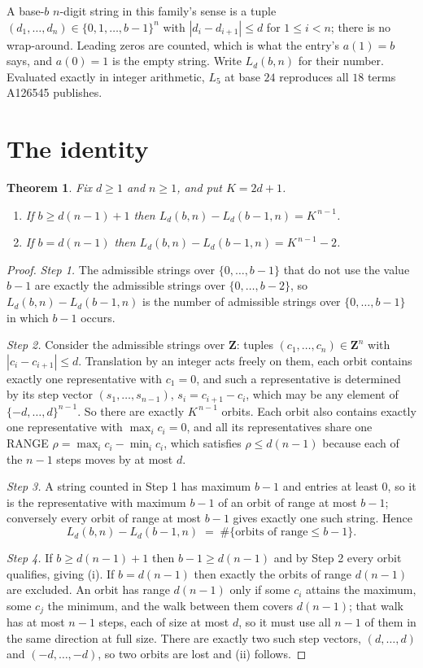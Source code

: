 \documentclass[11pt,a4paper]{article}
\theoremstyle{plain}
\newtheorem{theorem}{Theorem}
\theoremstyle{definition}
\begin{document}
A base-$b$ $n$-digit string in this family's sense is a tuple
$(d_1,\dots,d_n)\in\{0,1,\dots,b-1\}^{n}$ with $|d_i-d_{i+1}|\le d$ for $1\le i<n$; there
is no wrap-around. Leading zeros are counted, which is what the entry's $a(1)=b$ says, and
$a(0)=1$ is the empty string. Write $L_d(b,n)$ for their number. Evaluated exactly in integer
arithmetic, $L_{5}$ at base $24$ reproduces all $18$ terms A126545 publishes.

\section{The identity}

\begin{theorem}
Fix $d\ge1$ and $n\ge1$, and put $K=2d+1$.
\begin{enumerate}
\item[(i)] If $b\ge d(n-1)+1$ then $L_d(b,n)-L_d(b-1,n)=K^{\,n-1}$.
\item[(ii)] If $b=d(n-1)$ then $L_d(b,n)-L_d(b-1,n)=K^{\,n-1}-2$.
\end{enumerate}
\end{theorem}

\begin{proof}
\emph{Step 1.} The admissible strings over $\{0,\dots,b-1\}$ that do not use the value $b-1$
are exactly the admissible strings over $\{0,\dots,b-2\}$, so $L_d(b,n)-L_d(b-1,n)$ is the
number of admissible strings over $\{0,\dots,b-1\}$ in which $b-1$ occurs.

\emph{Step 2.} Consider the admissible strings over $\mathbf{Z}$: tuples
$(c_1,\dots,c_n)\in\mathbf{Z}^{n}$ with $|c_i-c_{i+1}|\le d$. Translation by an integer acts
freely on them, each orbit contains exactly one representative with $c_1=0$, and such a
representative is determined by its step vector $(s_1,\dots,s_{n-1})$, $s_i=c_{i+1}-c_i$,
which may be any element of $\{-d,\dots,d\}^{n-1}$. So there are exactly $K^{\,n-1}$ orbits.
Each orbit also contains exactly one representative with $\max_i c_i=0$, and all its
representatives share one RANGE $\rho=\max_ic_i-\min_ic_i$, which satisfies
$\rho\le d(n-1)$ because each of the $n-1$ steps moves by at most $d$.

\emph{Step 3.} A string counted in Step 1 has maximum $b-1$ and entries at least $0$, so it is
the representative with maximum $b-1$ of an orbit of range at most $b-1$; conversely every orbit
of range at most $b-1$ gives exactly one such string. Hence
\[
L_d(b,n)-L_d(b-1,n)\;=\;\#\{\text{orbits of range}\le b-1\} .
\]

\emph{Step 4.} If $b\ge d(n-1)+1$ then $b-1\ge d(n-1)$ and by Step 2 every orbit qualifies,
giving (i). If $b=d(n-1)$ then exactly the orbits of range $d(n-1)$ are excluded. An orbit has
range $d(n-1)$ only if some $c_i$ attains the maximum, some $c_j$ the minimum, and the walk
between them covers $d(n-1)$; that walk has at most $n-1$ steps, each of size at most $d$, so it
must use all $n-1$ of them in the same direction at full size. There are exactly two such step
vectors, $(d,\dots,d)$ and $(-d,\dots,-d)$, so two orbits are lost and (ii) follows.
\end{proof}
\end{document}
